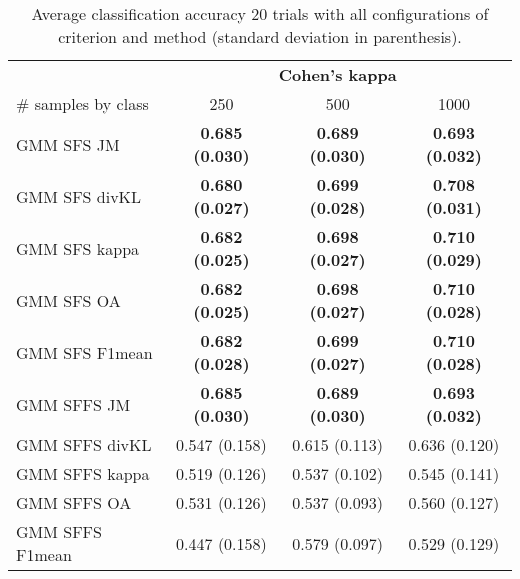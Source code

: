 \documentclass[a4paper,10pt,DIV=16]{scrartcl}
\begin{document}
    \begin{table}[!t]
        \centering
        \caption{Average classification accuracy 20 trials with all configurations of criterion and method (standard deviation in parenthesis).\label{tab:aisa-otbsimu-all}}
        \begin{tabular}{lccc}\toprule
             & \multicolumn{3}{c}{\bfseries Cohen's kappa} \\ \cmidrule{2-4}
            \# samples by class & 250 & 500 & 1000 \\ \midrule

            GMM SFS JM &      {\bfseries 0.685 (0.030)} & {\bfseries 0.689 (0.030)} & {\bfseries 0.693 (0.032)} \\
            GMM SFS divKL &   {\bfseries 0.680 (0.027)} & {\bfseries 0.699 (0.028)} & {\bfseries 0.708 (0.031)} \\
            GMM SFS kappa &   {\bfseries 0.682 (0.025)} & {\bfseries 0.698 (0.027)} & {\bfseries 0.710 (0.029)} \\
            GMM SFS OA &      {\bfseries 0.682 (0.025)} & {\bfseries 0.698 (0.027)} & {\bfseries 0.710 (0.028)} \\
            GMM SFS F1mean &  {\bfseries 0.682 (0.028)} & {\bfseries 0.699 (0.027)} & {\bfseries 0.710 (0.028)} \\
            GMM SFFS JM &     {\bfseries 0.685 (0.030)} & {\bfseries 0.689 (0.030)} & {\bfseries 0.693 (0.032)} \\
            GMM SFFS divKL &  0.547 (0.158) & 0.615 (0.113) & 0.636 (0.120) \\
            GMM SFFS kappa &  0.519 (0.126) & 0.537 (0.102) & 0.545 (0.141) \\
            GMM SFFS OA &     0.531 (0.126) & 0.537 (0.093) & 0.560 (0.127) \\
            GMM SFFS F1mean & 0.447 (0.158) & 0.579 (0.097) & 0.529 (0.129) \\
            \bottomrule
        \end{tabular}
    \end{table}
\end{document}
